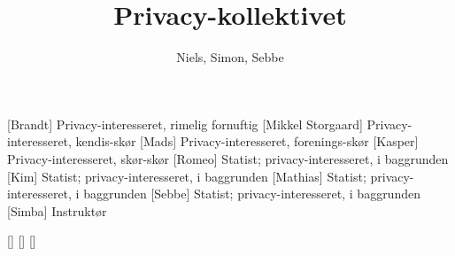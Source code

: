 \documentclass[a4paper,11pt]{article}
\title{Privacy-kollektivet}
\author{Niels, Simon, Sebbe}
\begin{document}
\maketitle

\begin{roles}
[Brandt] Privacy-interesseret, rimelig fornuftig
[Mikkel Storgaard] Privacy-interesseret, kendis-skør
[Mads] Privacy-interesseret, forenings-skør
[Kasper] Privacy-interesseret, skør-skør
[Romeo] Statist; privacy-interesseret, i baggrunden
[Kim] Statist; privacy-interesseret, i baggrunden
[Mathias] Statist; privacy-interesseret, i baggrunden
[Sebbe] Statist; privacy-interesseret, i baggrunden
[Simba] Instruktør
\end{roles}

\begin{props}
[]
[]
[]
\end{props}
\end{document}
